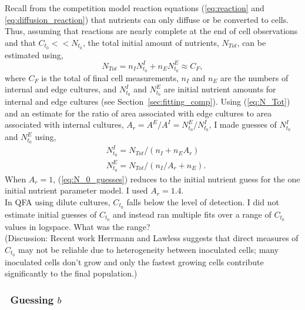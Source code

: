 Recall from the competition model reaction equations
(\ref{eq:reaction} and \ref{eq:diffusion_reaction}) that nutrients can
only diffuse or be converted to cells. Thus, assuming that
reactions are nearly complete at the end of cell observations and that
\(C_{t_{0}} << N_{t_{0}}\), the total initial amount of nutrients,
\(N_{Tot}\), can be estimated using,
\begin{equation}
  \label{eq:N_Tot}
  N_{Tot} = n_{I}N^{I}_{t_{0}} + n_{E}N^{E}_{t_{0}} \approx C_{F},
\end{equation}
where \(C_{F}\) is the total of final cell measurements, \(n_{I}\) and
\(n_{E}\) are the numbers of internal and edge cultures, and
\(N^{I}_{t_{0}}\) and \(N^{E}_{t_{0}}\) are initial nutrient amounts
for internal and edge cultures (see
Section~\ref{sec:fitting_comp}). Using (\ref{eq:N_Tot}) and an estimate
for the ratio of area associated with edge cultures to area associated
with internal cultures,
\(A_{r} = A^{E} / A^{I} = N^{E}_{t_{0}} / N^{I}_{t_{0}}\), I made
guesses of \(N^{I}_{t_{0}}\) and \(N^{E}_{t_{0}}\) using,
%
\begin{equation}
  \label{eq:N_0_guesses}
  \begin{aligned}
    &N^{I}_{t_{0}} = N_{Tot} / (n_{I} + n_{E}A_{r})\\
    &N^{E}_{t_{0}} = N_{Tot} / (n_{I}/A_{r} + n_{E}).
  \end{aligned}
\end{equation}
%
When \(A_{r} = 1\), (\ref{eq:N_0_guesses}) reduces to the initial
nutrient guess for the one initial nutrient parameter model. I used
\(A_{r} = 1.4\).
\\
In QFA using dilute cultures, \(C_{t_{0}}\) falls below the level of
detection.  I did not estimate initial guesses of \(C_{t_{0}}\) and
instead ran multiple fits over a range of \(C_{t_{0}}\) values in
logspace. What was the range?
\\
(Discussion: Recent work Herrmann and Lawless suggests that direct
measures of \(C_{t_{0}}\) may not be reliable due to heterogeneity
between inoculated cells; many inoculated cells don't grow and only
the fastest growing cells contribute significantly to the final
population.)

\subsubsection{\boldmath \thesubsubsection~Guessing  \(b\) \unboldmath}

